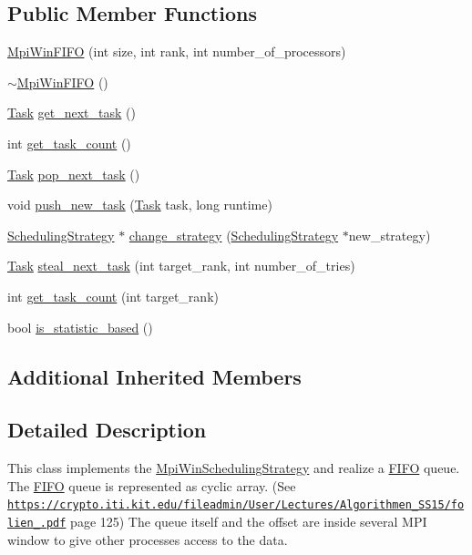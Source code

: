 \subsection*{Public Member Functions}
\begin{DoxyCompactItemize}
\item 
\hyperlink{class_mpi_win_f_i_f_o_a52b5238edee8c348afbf0d370c81d8ce}{Mpi\+Win\+F\+I\+F\+O} (int size, int rank, int number\+\_\+of\+\_\+processors)
\item 
\hyperlink{class_mpi_win_f_i_f_o_a6ca0a6e127618d262ae40d3171bbb672}{$\sim$\+Mpi\+Win\+F\+I\+F\+O} ()
\item 
\hyperlink{_types_8h_a0c77930ab3818a1680c59353f627fba8}{Task} \hyperlink{class_mpi_win_f_i_f_o_aeffee53a08818badfafed7642a41b955}{get\+\_\+next\+\_\+task} ()
\item 
int \hyperlink{class_mpi_win_f_i_f_o_a609d1de2a9afc8d82dfab9746fe7c885}{get\+\_\+task\+\_\+count} ()
\item 
\hyperlink{_types_8h_a0c77930ab3818a1680c59353f627fba8}{Task} \hyperlink{class_mpi_win_f_i_f_o_a1ceb2f48f1ae2fbbf14ab9227ba8df9e}{pop\+\_\+next\+\_\+task} ()
\item 
void \hyperlink{class_mpi_win_f_i_f_o_ab250777bda97e37530c354683a87e8b4}{push\+\_\+new\+\_\+task} (\hyperlink{_types_8h_a0c77930ab3818a1680c59353f627fba8}{Task} task, long runtime)
\item 
\hyperlink{class_scheduling_strategy}{Scheduling\+Strategy} $\ast$ \hyperlink{class_mpi_win_f_i_f_o_ae5620542c597abff58986506d595c29e}{change\+\_\+strategy} (\hyperlink{class_scheduling_strategy}{Scheduling\+Strategy} $\ast$new\+\_\+strategy)
\item 
\hyperlink{_types_8h_a0c77930ab3818a1680c59353f627fba8}{Task} \hyperlink{class_mpi_win_f_i_f_o_a8f4af1f3c3f90b939f3638bf321be3bf}{steal\+\_\+next\+\_\+task} (int target\+\_\+rank, int number\+\_\+of\+\_\+tries)
\item 
int \hyperlink{class_mpi_win_f_i_f_o_a7481a465167e95e3993251106fe40cb3}{get\+\_\+task\+\_\+count} (int target\+\_\+rank)
\item 
bool \hyperlink{class_mpi_win_f_i_f_o_ab568b8ec6f8eb9baabaae8552a938204}{is\+\_\+statistic\+\_\+based} ()
\end{DoxyCompactItemize}
\subsection*{Additional Inherited Members}


\subsection{Detailed Description}
This class implements the \hyperlink{class_mpi_win_scheduling_strategy}{Mpi\+Win\+Scheduling\+Strategy} and realize a \hyperlink{class_f_i_f_o}{F\+I\+F\+O} queue. The \hyperlink{class_f_i_f_o}{F\+I\+F\+O} queue is represented as cyclic array. (See \href{https://crypto.iti.kit.edu/fileadmin/User/Lectures/Algorithmen_SS15/folien_20150427.pdf}{\tt https\+://crypto.\+iti.\+kit.\+edu/fileadmin/\+User/\+Lectures/\+Algorithmen\+\_\+\+S\+S15/folien\+\_.\+pdf} page 125) The queue itself and the offset are inside several M\+P\+I window to give other processes access to the data.

